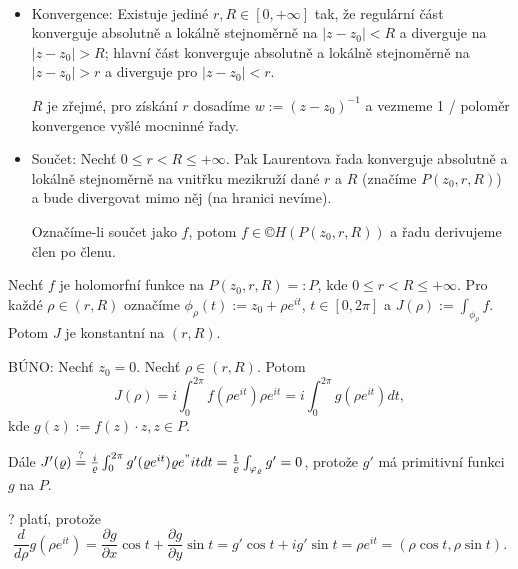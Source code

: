 \documentclass[12pt]{article}					%
\begin{document}
\begin{tvrzeni}[Vlastnosti]
	\ 
	
	\begin{itemize}
		\item Konvergence: Existuje jediné $r, R \in [0, +∞]$ tak, že regulární část konverguje absolutně a lokálně stejnoměrně na $|z - z_0| < R$ a diverguje na $|z - z_0| > R$; hlavní část konverguje absolutně a lokálně stejnoměrně na $|z - z_0| > r$ a diverguje pro $|z - z_0|<r$.

			$R$ je zřejmé, pro získání $r$ dosadíme $w := (z - z_0)^{-1}$ a vezmeme 1 / poloměr konvergence vyšlé mocninné řady.
		\item Součet: Nechť $0 ≤ r < R ≤ +∞$. Pak Laurentova řada konverguje absolutně a lokálně stejnoměrně na vnitřku mezikruží dané $r$ a $R$ (značíme $P(z_0, r, R)$) a bude divergovat mimo něj (na hranici nevíme).

			Označíme-li součet jako $f$, potom $f \in ©H(P(z_0, r, R))$ a řadu derivujeme člen po členu.
	\end{itemize}
\end{tvrzeni}

\begin{lemma}
	Nechť $f$ je holomorfní funkce na $P(z_0, r, R) =: P$, kde $0 ≤ r < R ≤ +∞$. Pro každé $\rho \in (r, R)$ označíme $\phi_\rho(t) := z_0 + \rho e^{it}$, $t \in [0, 2\pi]$ a $J(\rho) := \int_{\phi_\rho} f$. Potom $J$ je konstantní na $(r, R)$.

	\begin{dukazin}
		BÚNO: Nechť $z_0 = 0$. Nechť $\rho \in (r, R)$. Potom
		$$ J(\rho) = i \int_0^{2\pi} f(\rho e^{it}) \rho e^{it} = i \int_0^{2\pi} g(\rho e^{it}) dt, $$
		kde $g(z) := f(z)·z, z \in P$.

		Dále $J'(\rho) \overset?= \frac{i}{\rho} \int_0^{2\pi} g'(\rho e^{it}) \rho e^"{it} dt = \frac{1}{\rho} \int_{\phi_\rho} g' = 0$, protože $g'$ má primitivní funkci $g$ na $P$.

		? platí, protože
		$$ \frac{d}{d\rho}g(\rho e^{it}) = \frac{\partial g}{\partial x} \cos t + \frac{\partial g}{\partial y} \sin t = g' \cos t + i g' \sin t = \rho e^{it} = (\rho \cos t, \rho \sin t). $$
	\end{dukazin}
\end{lemma}
\end{document}
